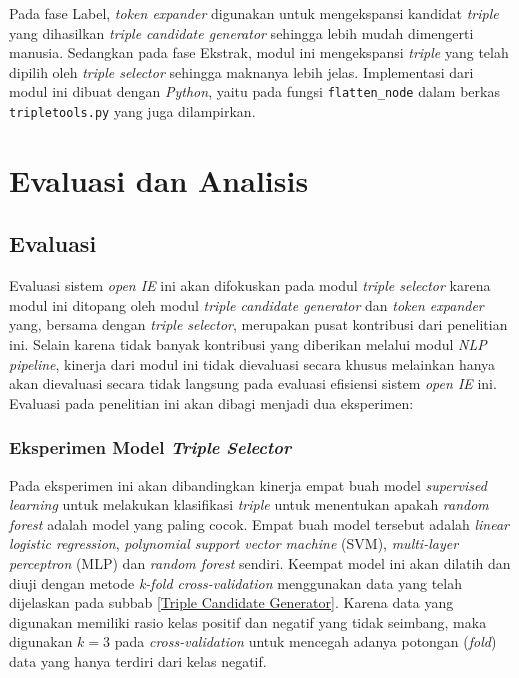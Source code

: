 Pada fase Label, \textit{token expander} digunakan untuk mengekspansi kandidat \textit{triple} yang dihasilkan \textit{triple candidate generator} sehingga lebih mudah dimengerti manusia. Sedangkan pada fase Ekstrak, modul ini mengekspansi \textit{triple} yang telah dipilih oleh \textit{triple selector} sehingga maknanya lebih jelas. Implementasi dari modul ini dibuat dengan \textit{Python}, yaitu pada fungsi \verb|flatten_node| dalam berkas \verb|tripletools.py| yang juga dilampirkan.

\section{Evaluasi dan Analisis}

\subsection{Evaluasi}

Evaluasi sistem \textit{open IE} ini akan difokuskan pada modul \textit{triple selector} karena modul ini ditopang oleh modul \textit{triple candidate generator} dan \textit{token expander} yang, bersama dengan \textit{triple selector}, merupakan pusat kontribusi dari penelitian ini. Selain karena tidak banyak kontribusi yang diberikan melalui modul \textit{NLP pipeline}, kinerja dari modul ini tidak dievaluasi secara khusus melainkan hanya akan dievaluasi secara tidak langsung pada evaluasi efisiensi sistem \textit{open IE} ini. Evaluasi pada penelitian ini akan dibagi menjadi dua eksperimen:

\subsubsection{Eksperimen Model \textit{Triple Selector}}

Pada eksperimen ini akan dibandingkan kinerja empat buah model \textit{supervised learning} untuk melakukan klasifikasi \textit{triple} untuk menentukan apakah \textit{random forest} adalah model yang paling cocok. Empat buah model tersebut adalah \textit{linear logistic regression}, \textit{polynomial support vector machine} (SVM), \textit{multi-layer perceptron} (MLP) dan \textit{random forest} sendiri. Keempat model ini akan dilatih dan diuji dengan metode \textit{k-fold cross-validation} menggunakan data yang telah dijelaskan pada subbab \ref{Triple Candidate Generator}. Karena data yang digunakan memiliki rasio kelas positif dan negatif yang tidak seimbang, maka digunakan $k = 3$ pada \textit{cross-validation} untuk mencegah adanya potongan (\textit{fold}) data yang hanya terdiri dari kelas negatif.

